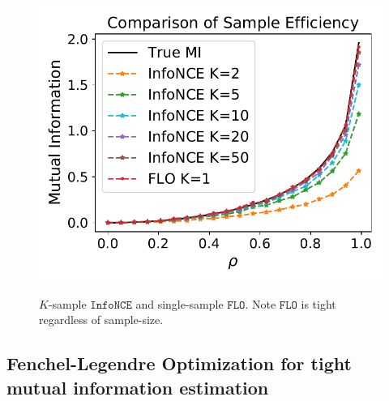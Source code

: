 \documentclass{article}
\theoremstyle{plain}
\theoremstyle{definition}
\theoremstyle{remark}
\newcommand{\infonce}{\texttt{InfoNCE}}
\newcommand{\FLO}{\texttt{FLO}}
\begin{document}
\begin{figure}
\begin{minipage}{.35\textwidth}
\begin{center}{
						\includegraphics[width=1.0\textwidth]{figures/toy/1dcompare.pdf}
					}
					\vspace{-2em}
					\caption{$K$-sample $\infonce$ and single-sample $\FLO$. Note $\FLO$ is tight regardless of sample-size. \label{fig:cmp_1d}}
				\end{center}
			\end{minipage}
			\vspace{-1.5em}
		\end{figure}
		
		
		
	
	
	
	\vspace{-8pt}
	\subsection{Fenchel-Legendre Optimization for tight mutual information estimation}
	\vspace{-5pt}
	\label{sec:flo}
	
	
\end{document}

